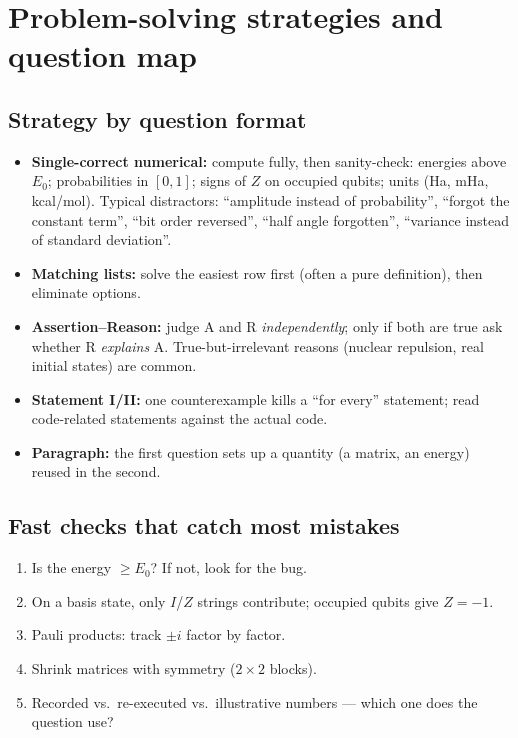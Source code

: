 \documentclass[11pt,a4paper,openany]{book}
\begin{document}
\section{Problem-solving strategies and question map}
\subsection{Strategy by question format}
\begin{itemize}[itemsep=3pt]
\item \textbf{Single-correct numerical:} compute fully, then sanity-check: energies above $E_0$; probabilities in $[0, 1]$; signs of $Z$ on occupied qubits;
      units (Ha, mHa, kcal/mol). Typical distractors: ``amplitude instead of probability'', ``forgot the constant term'', ``bit order reversed'',
      ``half angle forgotten'', ``variance instead of standard deviation''.
\item \textbf{Matching lists:} solve the easiest row first (often a pure definition), then eliminate options.
\item \textbf{Assertion--Reason:} judge A and R \emph{independently}; only if both are true ask whether R \emph{explains} A. True-but-irrelevant reasons
      (nuclear repulsion, real initial states) are common.
\item \textbf{Statement I/II:} one counterexample kills a ``for every'' statement; read code-related statements against the actual code.
\item \textbf{Paragraph:} the first question sets up a quantity (a matrix, an energy) reused in the second.
\end{itemize}
\subsection{Fast checks that catch most mistakes}
\begin{enumerate}[itemsep=2pt]
\item Is the energy $\ge E_0$? If not, look for the bug.
\item On a basis state, only $I$/$Z$ strings contribute; occupied qubits give $Z = -1$.
\item Pauli products: track $\pm i$ factor by factor.
\item Shrink matrices with symmetry ($2\times2$ blocks).
\item Recorded vs.\ re-executed vs.\ illustrative numbers --- which one does the question use?
\end{enumerate}
\end{document}
